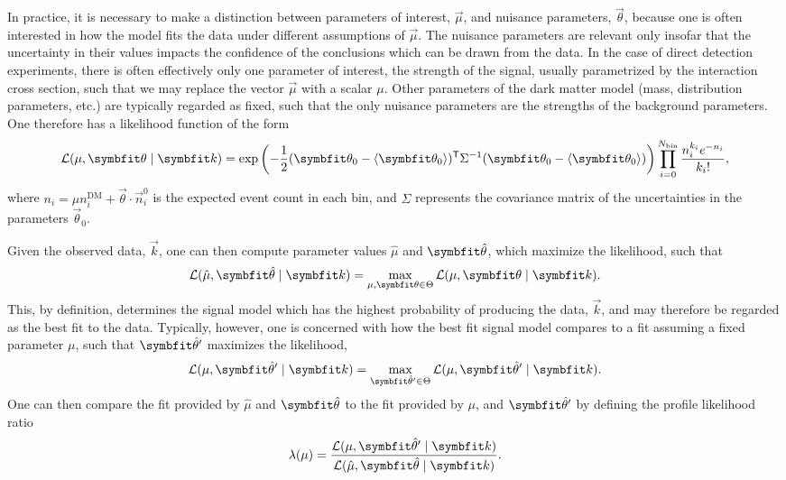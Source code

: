 In practice, it is necessary to make a distinction between parameters of interest, $\vec{\mu}$, and nuisance parameters, $\vec{\theta}$, because one is often interested in how the model fits the data under different assumptions of $\vec{\mu}$. The nuisance parameters are relevant only insofar that the uncertainty in their values impacts the confidence of the conclusions which can be drawn from the data. In the case of direct detection experiments, there is often effectively only one parameter of interest, the strength of the signal, usually parametrized by the interaction cross section, such that we may replace the vector $\vec{\mu}$ with a scalar $\mu$. Other parameters of the dark matter model (mass, distribution parameters, etc.) are typically regarded as fixed, such that the only nuisance parameters are the strengths of the background parameters. One therefore has a likelihood function of the form
\begin{equation}
    \mathcal{L}(\mu,\vec{\theta}\mid\vec{k})=\exp\left(-\frac{1}{2}(\vec{\theta}_0-\tmean{\vec{\theta}_0})^\transp\Sigma^{-1}(\vec{\theta}_0-\tmean{\vec{\theta}_0})\right)\prod_{i=0}^{N_\text{bin}}\frac{n_i^{k_i}e^{-n_i}}{{k_i}!},
    \label{eq:likelihood}
\end{equation}
where $n_i=\mu n_i^\text{DM}+\vec{\theta}\cdot\vec{n}_i^0$ is the expected event count in each bin, and $\Sigma$ represents the covariance matrix of the uncertainties in the parameters $\vec{\theta}_0$.

Given the observed data, $\vec{k}$, one can then compute parameter values $\hat{\mu}$ and $\unitv{\theta}$, which maximize the likelihood, such that
\begin{equation}
    \mathcal{L}(\hat{\mu},\unitv{\theta}\mid\vec{k})=\max_{\mu,\vec{\theta}\in\Theta}\mathcal{L}(\mu,\vec{\theta}\mid\vec{k}).
\end{equation}
This, by definition, determines the signal model which has the highest probability of producing the data, $\vec{k}$, and may therefore be regarded as the best fit to the data. Typically, however, one is concerned with how the best fit signal model compares to a fit assuming a fixed parameter $\mu$, such that $\unitv{\theta}'$ maximizes the likelihood,
\begin{equation}
    \mathcal{L}(\mu,\unitv{\theta}'\mid\vec{k})=\max_{\unitv{\theta}'\in\Theta}\mathcal{L}(\mu,\unitv{\theta}'\mid\vec{k}).
\end{equation}
One can then compare the fit provided by $\hat{\mu}$ and $\unitv{\theta}$ to the fit provided by $\mu$, and $\unitv{\theta}'$ by defining the profile likelihood ratio
\begin{equation}
    \lambda(\mu)=\frac{\mathcal{L}(\mu,\unitv{\theta}'\mid\vec{k})}{\mathcal{L}(\hat{\mu},\unitv{\theta}\mid\vec{k})}.
\end{equation}

